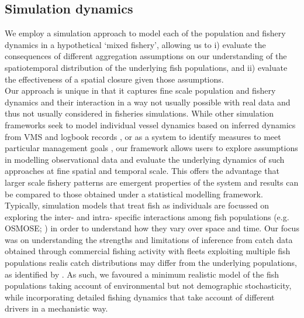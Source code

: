 \documentclass[review]{elsarticle}
\begin{document}
\subsection{Simulation dynamics}
 
We employ a simulation approach to model each of the population and fishery
dynamics in a hypothetical `mixed fishery', allowing us to i) evaluate the
consequences of different aggregation assumptions on our understanding of the
spatiotemporal distribution of the underlying fish populations, and ii)
evaluate the effectiveness of a spatial closure given those assumptions. \\

Our approach is unique in that it captures fine scale population and fishery
dynamics and their interaction in a way not usually possible with real data and
thus not usually considered in fisheries simulations. While other simulation
frameworks seek to model individual vessel dynamics based on inferred dynamics
from VMS and logbook records \citep{Bastardie2010}, or as a system to identify
measures to meet particular management goals \citep{Bailey2018}, our framework
allows users to explore  assumptions in modelling observational
data and  evaluate the underlying dynamics of such approaches at
 fine spatial and temporal scale.  This offers the
advantage that larger scale fishery patterns are emergent properties of the
system and results can be compared to those obtained under a statistical
modelling framework. \\

Typically, simulation models that treat fish as individuals are focussed on
exploring the inter- and intra- specific interactions among fish populations
(e.g. OSMOSE; \cite{Shin2004}) in order to understand how they vary over space
and time. Our focus was on understanding the strengths and limitations of
inference from catch data obtained through commercial fishing activity with
fleets exploiting multiple fish populations realis catch distributions may differ from the underlying populations, as identified by
\cite{Gillis2008}. As such, we favoured a minimum realistic model of the fish
populations \citep{Plaganyi2014} taking account of environmental but not
demographic stochasticity, while incorporating detailed fishing dynamics that
take account of different drivers in a mechanistic way.  \\ 
\end{document}
